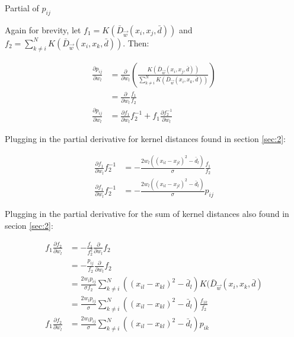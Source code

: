 \documentclass[12pt, a4paper]{article}
\begin{document}
\begin{section}{Partial of $p_{ij}$} \label{sec:3}

    Again for brevity, let $f_1 = K (\bar D_{\vec w}(x_i, x_j, \bar d) )$ and
    $f_2 = \sum \limits_{k \neq i}^N K (\bar D_{\vec w}(x_i, x_k, \bar d) )$.
    Then:

    \begin{align*}
        \frac{\partial p_{ij}}{\partial w_l} &=
        \frac{\partial}{\partial w_l} \left (
        \frac{K (\bar D_{\vec w}(x_i, x_j, \bar d))}
            {\sum \limits_{k \neq i}^N K (\bar D_{\vec w}(x_i, x_k, \bar d))}
            \right ) \\
        &=  
            \frac{\partial}{\partial w_l} \frac{f_1}{f_2} \\
        \frac{\partial p_{ij}}{\partial w_l}
        &= 
        \frac{\partial f_1}{\partial w_l} f_2^{-1} +
           f_1 \frac{\partial f_2^{-1}}{\partial w_l}
    \end{align*}

    Plugging in the partial derivative for kernel distances found in section
    \ref{sec:2}:

    \begin{align*}
        \frac{\partial f_1}{\partial w_l} f_2^{-1} &= 
            - \frac{ 2w_l\left ( (x_{il} - x_{jl})^2 - \bar d_l \right )}{\sigma}
            \frac{f_1}{f_2} \\
        \frac{\partial f_1}{\partial w_l} f_2^{-1} &= 
            - \frac{ 2w_l\left ( (x_{il} - x_{jl})^2 - \bar d_l \right )}{\sigma}
            p_{ij}
    \end{align*}

    Plugging in the partial derivative for the sum of kernel distances also
    found in secion \ref{sec:2}:

    \begin{align*}
        f_1 \frac{\partial f_2}{\partial w_l} &= 
            - \frac{f_1}{f_2^2} \frac{\partial}{\partial w_l}f_2 \\
        &= - \frac{p_{ij}}{f_2} \frac{\partial}{\partial w_l}f_2 \\
        &= \frac{2w_l p_{ij}}{\sigma f_2} \sum \limits_{k \neq i}^N
        \left ( (x_{il} - x_{kl})^2 - \bar d_l \right )
        K (\bar D_{\vec w}(x_i, x_k, \bar d) \\
        &= \frac{2w_l p_{ij}}{\sigma} \sum \limits_{k \neq i}^N
        \left ( (x_{il} - x_{kl})^2 - \bar d_l \right ) \frac{f_{1k}}{f_2} \\
        f_1 \frac{\partial f_2}{\partial w_l} &=
        \frac{2w_l p_{ij}}{\sigma} \sum \limits_{k \neq i}^N
        \left ( (x_{il} - x_{kl})^2 - \bar d_l \right ) p_{ik}
    \end{align*}


\end{section}
\end{document}
